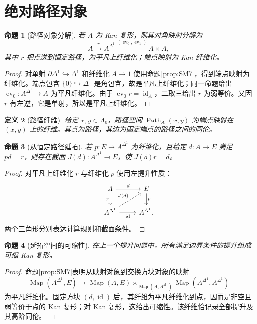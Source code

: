 \documentclass[12pt,oneside,openany,fontset=none]{ctexbook}
\theoremstyle{cn}
\newtheorem{definition}{定义}[chapter]
\newtheorem{proposition}[definition]{命题}
\numberwithin{equation}{chapter}
\newcommand{\id}{\operatorname{id}}
\newcommand{\Map}{\operatorname{Map}}
\newcommand{\ev}{\operatorname{ev}}
\begin{document}
\section{绝对路径对象}
\begin{proposition}[路径对象分解]
若 $A$ 为 Kan 复形，则其对角映射分解为
\[
A\xrightarrow{r}A^{\Delta^1}
\xrightarrow{(\ev_0,\ev_1)}A\times A,
\]
其中 $r$ 把点送到恒定路径，为平凡上纤维化；端点映射为 Kan 纤维化。
\end{proposition}
\begin{proof}
对单射 $\partial\Delta^1\hookrightarrow\Delta^1$ 和纤维化 $A\to1$ 使用命题\ref{prop:SM7}，得到端点映射为纤维化。端点包含 $\{0\}\hookrightarrow\Delta^1$ 是角包含，故是平凡上纤维化；同一命题给出 $\ev_0:A^{\Delta^1}\to A$ 为平凡纤维化。由于 $\ev_0r=\id_A$，二取三给出 $r$ 为弱等价。又因 $r$ 有左逆，它是单射，所以是平凡上纤维化。
\end{proof}
\begin{definition}[路径纤维]
给定 $x,y\in A_0$，路径空间 $\operatorname{Path}_A(x,y)$ 为端点映射在 $(x,y)$ 上的纤维。其点为路径，其边为固定端点的路径之间的同伦。
\end{definition}
\begin{proposition}[从恒定路径延拓]
若 $p:E\to A^{\Delta^1}$ 为纤维化，且给定 $d:A\to E$ 满足 $pd=r$，则存在截面 $J(d):A^{\Delta^1}\to E$，使 $J(d)r=d$。
\end{proposition}
\begin{proof}
对平凡上纤维化 $r$ 与纤维化 $p$ 使用左提升性质：
\[
\begin{tikzcd}
A\ar[r,"d"]\ar[d,"r"']&E\ar[d,"p"]\\
A^{\Delta^1}\ar[r,"\id"']\ar[ur,dashed,"J(d)"]&A^{\Delta^1}.
\end{tikzcd}
\]
两个三角形分别表达计算规则和截面条件。
\end{proof}
\begin{proposition}[延拓空间的可缩性]
在上一个提升问题中，所有满足边界条件的提升组成可缩 Kan 复形。
\end{proposition}
\begin{proof}
命题\ref{prop:SM7}表明从映射对象到交换方块对象的映射
\[
\Map(A^{\Delta^1},E)\to
\Map(A,E)\times_{\Map(A,A^{\Delta^1})}
\Map(A^{\Delta^1},A^{\Delta^1})
\]
为平凡纤维化。固定方块 $(d,\id)$ 后，其纤维为平凡纤维化到点，因而是非空且弱等价于点的 Kan 复形；对 Kan 复形，这给出可缩性。该纤维恰记录全部提升及其高阶同伦。
\end{proof}
\end{document}
